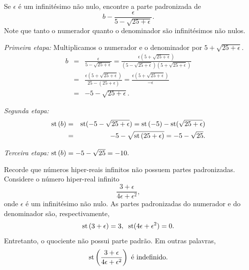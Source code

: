 \begin{example}
Se $\epsilon$ é um infinitésimo não nulo, encontre a parte padronizada de
$$
  b - \frac{\epsilon}{5 - \sqrt{25 + \epsilon}}.
$$
Note que tanto o numerador quanto o denominador são infinitésimos não
nulos.

\emph{Primeira etapa:} Multiplicamos o numerador e o denominador por
$5 + \sqrt{25 + \epsilon}$.
\begin{eqnarray*}
  b & = & \frac{\epsilon}{5 - \sqrt{25 + \epsilon}} =
          \frac{\epsilon(5 + \sqrt{25 + \epsilon})}%
               {(5-\sqrt{25+\epsilon})(5+\sqrt{25+\epsilon})} \\
    & = & \frac{\epsilon(5 + \sqrt{25 + \epsilon})}%
               {25 - (25 + \epsilon)} =
          \frac{\epsilon(5 + \sqrt{25 + \epsilon})}{-\epsilon} \\
    & = & -5 - \sqrt{25 + \epsilon}.
\end{eqnarray*}

\emph{Segunda etapa:}
\begin{eqnarray*}
  \operatorname{st}\left(b\right) & = & \operatorname{st}(-5 - \sqrt{25 + \epsilon}) = 
               \operatorname{st}\left(-5\right) -\operatorname{st}(\sqrt{25 + \epsilon}) \\
         & = & -5 - \sqrt{\operatorname{st}\left(25 + \epsilon\right)} = -5 - \sqrt{25}.
\end{eqnarray*}

\emph{Terceira etapa:} $\operatorname{st}\left(b\right) = -5 - \sqrt{25} = -10.$
\end{example}

\begin{example}
Recorde que números hiper-reais infinitos não possuem partes padronizadas.
Considere o número hiper-real infinito
$$
  \frac{3 + \epsilon}{4\epsilon + \epsilon^2},
$$
onde $\epsilon$ é um infinitésimo não nulo. As partes padronizadas do
numerador e do denominador são, respectivamente,
$$
  \operatorname{st}\left(3+\epsilon\right) = 3, \; \; \operatorname{st}(4\epsilon + \epsilon^2) = 0.
$$
Entretanto, o quociente não possui parte padrão. Em outras palavras,
$$
  \operatorname{st}\left(\frac{3 + \epsilon}{4\epsilon + \epsilon^2}\right) \text{ é indefinido.}
$$
\end{example}

\begingroup
\def\eps{\epsilon}
\def\dx{\Delta{x}}
\def\dy{\Delta{y}}
\def\spc{\hspace{3ex}}
\everymath{\displaystyle}
\def\Exer#1#2{\exer{\hspace{0em}\rlap{#1}\hspace{0.4\textwidth}\rlap{#2}}}

